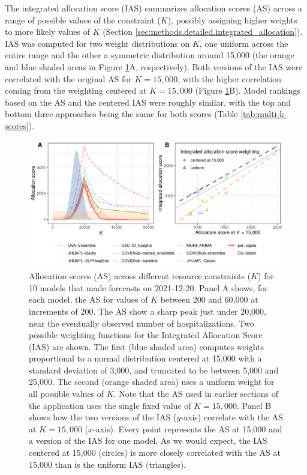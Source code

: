 \documentclass{article}\usepackage[]{graphicx}\usepackage[]{xcolor}
\makeatletter
\def\maxwidth{ %
  \ifdim\Gin@nat@width>\linewidth
    \linewidth
  \else
    \Gin@nat@width
  \fi
}
\newenvironment{knitrout}{}{} %
\makeatother
\begin{document}
The integrated allocation score (IAS) summarizes allocation scores (AS) across a range of possible values of the
constraint ($K$), possibly assigning higher weights to more likely values of $K$ (Section
\ref{sec:methods.detailed.integrated_allocation}). IAS was computed for two weight distributions on $K$, one uniform
across the entire range and the other a symmetric distribution around 15,000 (the orange and blue shaded areas in Figure
\ref{fig:multi-k}A, respectively). Both versions of the IAS were correlated with the original AS for $K=15,000$, with
the higher correlation coming from the weighting centered at $K=15,000$ (Figure \ref{fig:multi-k}B). Model rankings
based on the AS and the centered IAS were roughly similar, with the top and bottom three approaches being the same for
both scores (Table \ref{tab:multi-k-scores}).

\begin{knitrout}
\color{fgcolor}\begin{figure}[H]
\includegraphics[width=\maxwidth]{figure/multi-k-1} \caption[Allocation scores (AS) across different resource constraints ($K$) for 10 models that made forecasts on 2021-12-20]{Allocation scores (AS) across different resource constraints ($K$) for 10 models that made forecasts on 2021-12-20. Panel A shows, for each model, the AS for values of $K$ between 200 and 60,000 at increments of 200. The AS show a sharp peak just under 20,000, near the eventually observed number of hospitalizations. Two possible weighting functions for the Integrated Allocation Score (IAS) are shown. The first (blue shaded area) computes weights proportional to a normal distribution centered at 15,000 with a standard deviation of 3,000, and truncated to be between 5,000 and 25,000. The second (orange shaded area) uses a uniform weight for all possible values of $K$. Note that the AS used in earlier sections of the application uses the single fixed value of $K=15,000$.  Panel B shows how the two versions of the IAS ($y$-axis) correlate with the AS at $K=15,000$ ($x$-axis). Every point represents the AS at 15,000 and a version of the IAS for one model. As we would expect, the IAS centered at 15,000 (circles) is more closely correlated with the AS at 15,000 than is the uniform IAS (triangles).}\label{fig:multi-k}
\end{figure}

\end{knitrout}
\end{document}
